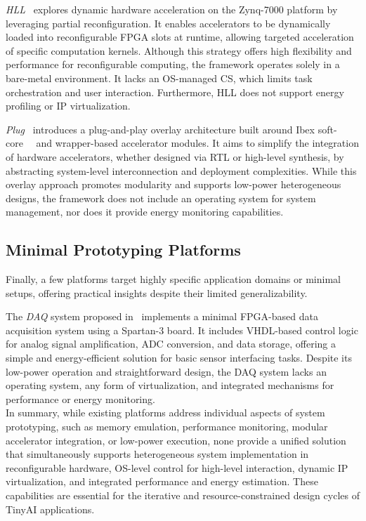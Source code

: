             \emph{HLL}~\cite{hll} explores dynamic hardware acceleration on the Zynq-7000 platform by leveraging partial reconfiguration. It enables accelerators to be dynamically loaded into reconfigurable FPGA slots at runtime, allowing targeted acceleration of specific computation kernels. Although this strategy offers high flexibility and performance for reconfigurable computing, the framework operates solely in a bare-metal environment. It lacks an OS-managed CS, which limits task orchestration and user interaction. Furthermore, HLL does not support energy profiling or IP virtualization.
            
            \emph{Plug}~\cite{plug} introduces a plug-and-play overlay architecture built around Ibex soft-core~~\cite{zeroriscy} and wrapper-based accelerator modules. It aims to simplify the integration of hardware accelerators, whether designed via RTL or high-level synthesis, by abstracting system-level interconnection and deployment complexities. While this overlay approach promotes modularity and supports low-power heterogeneous designs, the framework does not include an operating system for system management, nor does it provide energy monitoring capabilities.

        \vspace{-1em}    
        \subsection{Minimal Prototyping Platforms}
        
            Finally, a few platforms target highly specific application domains or minimal setups, offering practical insights despite their limited generalizability.
            
            The \emph{DAQ} system proposed in~\cite{daq} implements a minimal FPGA-based data acquisition system using a Spartan-3 board. It includes VHDL-based control logic for analog signal amplification, ADC conversion, and data storage, offering a simple and energy-efficient solution for basic sensor interfacing tasks. Despite its low-power operation and straightforward design, the DAQ system lacks an operating system, any form of virtualization, and integrated mechanisms for performance or energy monitoring.\\

            
        In summary, while existing platforms address individual aspects of system prototyping, such as memory emulation, performance monitoring, modular accelerator integration, or low-power execution, none provide a unified solution that simultaneously supports heterogeneous system implementation in reconfigurable hardware, OS-level control for high-level interaction, dynamic IP virtualization, and integrated performance and energy estimation. These capabilities are essential for the iterative and resource-constrained design cycles of TinyAI applications.
            
